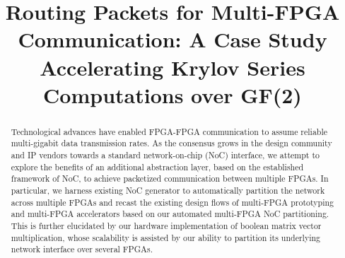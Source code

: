 \documentclass[conference, 9pt]{IEEEtran}
\newcommand{\red}[1]{\textcolor{red}{#1}}
\begin{document}
 

\title{Routing Packets for Multi-FPGA Communication: A Case Study Accelerating Krylov Series Computations over GF(2)}
\maketitle 

\begin{abstract}
Technological advances have enabled FPGA-FPGA communication to assume reliable multi-gigabit data transmission rates. As the consensus grows in the design community and IP vendors towards a standard network-on-chip (NoC) interface, we attempt to explore the benefits of an additional abstraction layer, based on the established framework of NoC, to achieve packetized communication between multiple FPGAs. In particular, we harness existing NoC generator to automatically partition the network across multiple FPGAs and recast the existing design flows of multi-FPGA prototyping and multi-FPGA accelerators based on our automated multi-FPGA NoC partitioning. This is further elucidated by our hardware implementation of boolean matrix vector multiplication, whose scalability is assisted by our ability to partition its underlying network interface over several FPGAs. 
\end{abstract}


\IEEEpeerreviewmaketitle
\end{document}
